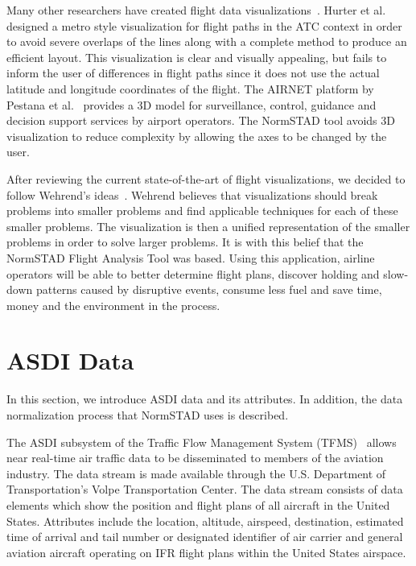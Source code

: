 \documentclass{sig-alternate}
\begin{document}
Many other researchers have created flight data 
visualizations~\cite{Conv2011,  Hunter10, Klein06, Palmer08, Pestana05}.
Hurter et al.~\cite{Hurter10} designed a metro style visualization
for flight paths in the ATC context in
order to avoid severe overlaps of the lines
along with a complete method to produce an efficient layout.
This visualization is clear and visually appealing, but fails 
to inform the user of differences in flight paths since it 
does not use the actual latitude and longitude coordinates
of the flight. The AIRNET platform by Pestana et al.~\cite{Pestana05}
provides a 3D model for surveillance, control, guidance and decision
support services by airport operators. The NormSTAD tool avoids
3D visualization to reduce complexity by allowing the axes to be changed  
by the user.

After reviewing the current state-of-the-art of flight visualizations,
we decided to follow Wehrend's ideas~\cite{Weh90}. Wehrend believes
that visualizations should break problems into smaller problems
and find applicable techniques for each of these smaller problems.
The visualization is then a unified representation of the smaller
problems in order to solve larger problems. It is with this belief
that the NormSTAD Flight Analysis Tool was based. Using this application,
airline operators will be able to better determine flight plans,
discover holding and slow-down patterns caused by disruptive events, consume
less fuel and save time, money and the environment in the process. 



\section{ASDI Data}
\label{sec-asdi}

In this section, we introduce ASDI data and its
attributes. In addition, the data normalization
process that NormSTAD uses is described.

The ASDI subsystem of the Traffic Flow
Management System (TFMS)~\cite{TFMS} allows near
real-time air traffic data to be disseminated to
members of the aviation industry. The data stream
is made available through the U.S. Department
of Transportation's Volpe Transportation Center.
The data stream consists of data elements which
show the position and flight plans of all aircraft
in the United States. Attributes include the location, altitude,
airspeed, destination, estimated time of arrival and
tail number or designated identifier of air carrier
and general aviation aircraft operating on IFR flight
plans within the United States airspace.
\end{document}
